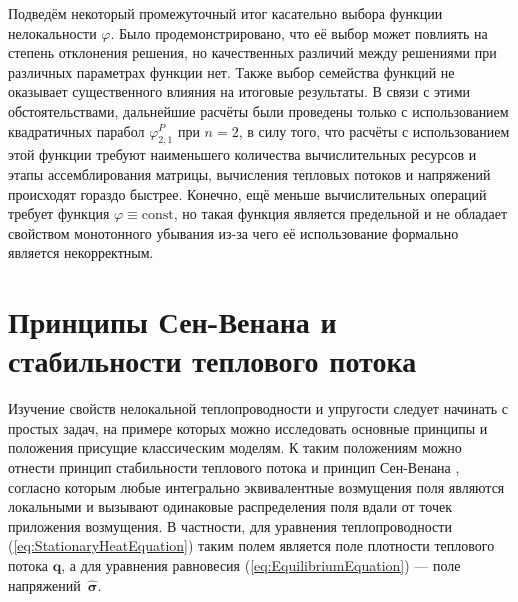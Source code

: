Подведём некоторый промежуточный итог касательно выбора функции нелокальности $\varphi$. Было продемонстрировано, что её выбор может повлиять на степень отклонения решения, но качественных различий между решениями при различных параметрах функции нет. Также выбор семейства функций не оказывает существенного влияния на итоговые результаты. В связи с этими обстоятельствами, дальнейшие расчёты были проведены только с использованием квадратичных парабол $\varphi_{2,1}^P$ при $n = 2$, в силу того, что расчёты с использованием этой функции требуют наименьшего количества вычислительных ресурсов и этапы ассемблирования матрицы, вычисления тепловых потоков и напряжений происходят гораздо быстрее. Конечно, ещё меньше вычислительных операций требует функция $\varphi \equiv \text{const}$, но такая функция является предельной и не обладает свойством монотонного убывания из-за чего её использование формально является некорректным.

\section{Принципы Сен-Венана и стабильности теплового потока}\label{sec:ResultsAnalysis/SaintVenant}

Изучение свойств нелокальной теплопроводности и упругости следует начинать с простых задач, на примере которых можно исследовать основные принципы и положения присущие классическим моделям. К таким положениям можно отнести принцип стабильности теплового потока \cite{ThermalStability} и принцип Сен-Венана \cite{SaintVenant}, согласно которым любые интегрально эквивалентные возмущения поля являются локальными и вызывают одинаковые распределения поля вдали от точек приложения возмущения. В частности, для уравнения теплопроводности (\ref{eq:StationaryHeatEquation}) таким полем является поле плотности теплового потока $\boldsymbol{q}$, а для уравнения равновесия (\ref{eq:EquilibriumEquation}) --- поле \mbox{напряжений $\widehat{\boldsymbol{\sigma}}$.}

